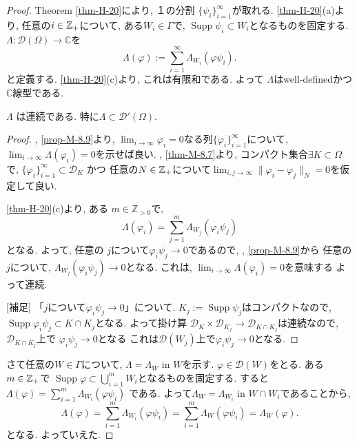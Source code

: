 \begin{proof}
Theorem \ref{thm-H-20}により, １の分割
\(\{\psi_i\}_{i=1}^\infty\)が取れる.   
\ref{thm-H-20}(a)より, 任意の\(i \in \mathbb{Z}_+\)について, ある\(W_i \in \Gamma\)で, \(\operatorname{Supp}\psi_i \subset W_i\)となるものを固定する. 
 \(\Lambda: \mathcal{D}(\Omega) \to \mathbb{C}\)を
\[
\Lambda(\varphi) := \sum_{i=1}^\infty \Lambda_{W_i}(\varphi \psi_i).
\]
と定義する. \ref{thm-H-20}(c)より, これは有限和である. 
よって \(\Lambda\)はwell-definedかつ\(\mathbb{C}\)線型である.

\begin{tcolorbox}[mybox]
\begin{claim}
\(\Lambda\) は連続である. 特に\(\Lambda \subset \mathcal{D}'(\Omega)\).  
\end{claim}
\end{tcolorbox}
\begin{proof}
\cite[Thm 6.6]{Rud}, \ref{prop-M-8.9}より,  $\lim_{i \to \infty} \varphi_i = 0$なる列\(\{\varphi_i\}_{i=1}^\infty\)について, 
$\lim_{i \to \infty} \Lambda(\varphi_i)=0$を示せば良い. 
\cite[Thm 6.5]{Rud}, \ref{thm-M-8.7}より, コンパクト集合\(\exists K \subset \Omega\)で,  \(\{\varphi_i\}_{i=1}^\infty \subset \mathcal{D}_K\) かつ 任意の$N \in \mathbb{Z}_+$について\(\lim_{i,j \to \infty} \|\varphi_i - \varphi_j\|_N = 0\)を仮定して良い. 

\ref{thm-H-20}(c)より, ある \(m \in \mathbb{Z}_{>0}\)で, 
\[
\Lambda(\varphi_i) = \sum_{j=1}^m \Lambda_{W_j}(\varphi_i \psi_j) 
\]
となる. 
よって,  任意の $j$について\(\varphi_i \psi_j \to 0\)であるので, \cite[Thm 6.6]{Rud}, \ref{prop-M-8.9}から
任意の$j$について, \(\Lambda_{W_j}(\varphi_i \psi_j) \to 0\)となる. 
これは, \( \lim_{i \to \infty} \Lambda(\varphi_i) = 0\)を意味する よって連続.

[補足]
「$j$について\(\varphi_i \psi_j \to 0\)」について. 
\(K_j := \operatorname{Supp} \psi_j\)はコンパクトなので, 
\(\operatorname{Supp} \varphi_i \psi_j \subset K \cap K_j\)となる. 
よって掛け算
\(\mathcal{D}_K \times \mathcal{D}_{K_j} \to \mathcal{D}_{K \cap K_j} \)は連続なので,   
$\mathcal{D}_{K \cap K_j}$上で
\(\varphi_i \psi_j \to 0 \)となる
これは$\mathcal{D}(W_j)$上で\( \varphi_i \psi_j \to 0 \)となる. 
\end{proof}


さて任意の$W \in \Gamma$について, 
 \(\Lambda = \Lambda_W \text{ in } W \)を示す.   
\(\varphi \in \mathcal{D}(W)\)をとる. ある\(m \in \mathbb{Z}_+\)で
\(\operatorname{Supp}\varphi \subset \bigcup_{i=1}^m W_i\)となるものを固定する. 
すると  
\(\Lambda(\varphi) = \sum_{i=1}^m \Lambda_{W_i}(\varphi \psi_i)\)
である. よって$\Lambda_W = \Lambda_{W_i} \text{ in } W \cap W_i $であることから, 
\[
\Lambda (\varphi)
= \sum_{i=1}^m \Lambda_{W_i}(\varphi \psi_i)
= \sum_{i=1}^m \Lambda_{W}(\varphi \psi_i)
 = \Lambda_W(\varphi).
\]
となる. よっていえた.


\end{proof}
